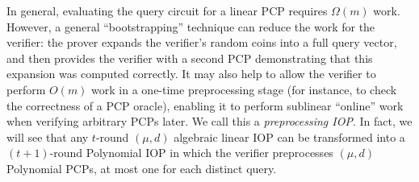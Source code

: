 In general, evaluating the query circuit for a linear PCP requires $\Omega(m)$ work. However, a general ``bootstrapping'' technique can reduce the work for the verifier: the prover expands the verifier's random coins into a full query vector, and then provides the verifier with a second PCP demonstrating that this expansion was computed correctly. It may also help to allow the verifier to perform $O(m)$ work in a one-time preprocessing stage (for instance, to check the correctness of a PCP oracle), enabling it to perform sublinear ``online'' work when verifying arbitrary PCPs later. We call this a \emph{preprocessing IOP}. In fact, we will see that any $t$-round $(\mu, d)$ algebraic linear IOP can be transformed into a $(t+1)$-round Polynomial IOP in which the verifier preprocesses $(\mu, d)$ Polynomial PCPs, at most one for each distinct query. 





